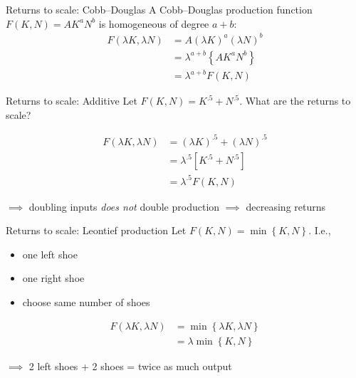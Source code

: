 \documentclass[presentation,dvipsnames]{beamer}
\begin{document}
\begin{frame}[label=sec-2-6]{Returns to scale: Cobb--Douglas}
A Cobb--Douglas production function $F(K,N) = AK^{a}N^{b}$ is homogeneous of degree $a + b$:
\begin{align*}
F(\lambda K, \lambda N) &= A \left( \lambda K \right)^{a} \left( \lambda N \right)^{b} \\
&= \lambda^{a+b} \left\{ AK^{a}N^{b} \right\} \\
&= \lambda^{a+b} F(K,N)
\end{align*}
\end{frame}

\begin{frame}[label=sec-2-6]{Returns to scale: Additive}
Let $F(K,N) = K^{.5} + N^{.5}$. What are the returns to scale?

\begin{align*}
F(\lambda K, \lambda N) &= \left( \lambda K \right)^{.5} + \left( \lambda N \right)^{.5} \\
&= \lambda^{.5} \left[ K^{.5} + N^{.5} \right] \\
&= \lambda^{.5} F(K,N)
\end{align*}

$\implies$ doubling inputs \emph{does not} double production $\implies$ decreasing returns
\end{frame}

\begin{frame}[label=sec-2-6]{Returns to scale: Leontief production}
Let $F(K,N) = \min \left\{ K, N \right\}$. I.e.,
\begin{itemize}[label={--}]
\item one left shoe
\item one right shoe
\item choose same number of shoes
\end{itemize}

\begin{align*}
F(\lambda K, \lambda N) &= \min \left\{ \lambda K, \lambda N \right\} \\
&= \lambda \min \left\{ K,N \right\}
\end{align*}

$\implies$ 2 left shoes + 2 shoes = twice as much output
\end{frame}
\end{document}
